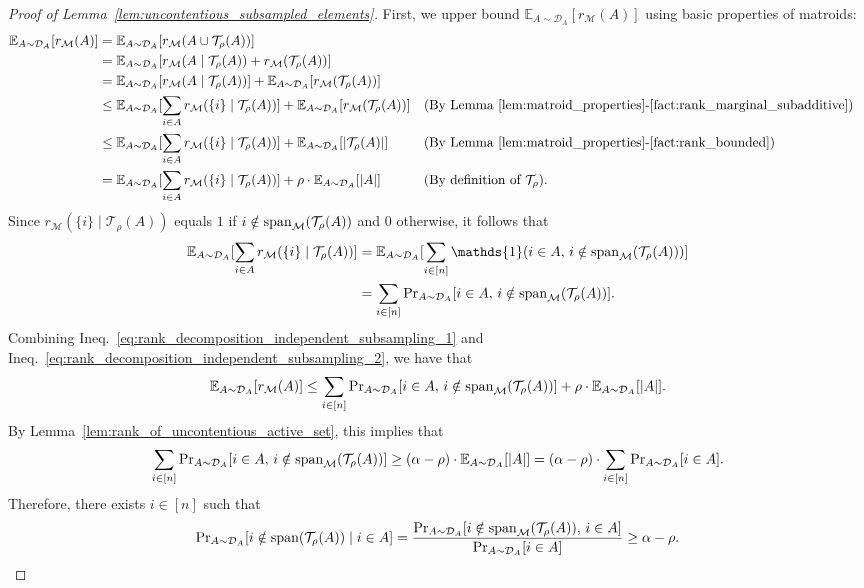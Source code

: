 \documentclass[11pt]{article}
\newcommand{\D}{\mathcal D}
\def \E {\mathbb{E}}
\newcommand{\M}{{\mathcal M}}
\newcommand{\T}{{\mathcal T}}
\newcommand{\spa}{\textnormal{span}}
\begin{document}
\begin{proof}[Proof of Lemma~\ref{lem:uncontentious_subsampled_elements}]
First, we upper bound $\E_{A\sim\D_A}[r_{\M}(A)]$ using basic properties of matroids:
\begin{align}\label{eq:rank_decomposition_independent_subsampling_1}
    \E_{A\sim\D_A}[r_{\M}(A)]&=\E_{A\sim\D_A}[r_{\M}(A\cup\T_{\rho}(A))]\nonumber\\
    &=\E_{A\sim\D_A}[r_{\M}(A\mid\T_{\rho}(A))+r_{\M}(\T_{\rho}(A))]\nonumber\\
    &=\E_{A\sim\D_A}[r_{\M}(A\mid\T_{\rho}(A))]+\E_{A\sim\D_A}[r_{\M}(\T_{\rho}(A))] \nonumber\\
    &\le\E_{A\sim\D_A}[\sum_{i\in A}r_{\M}(\{i\}\mid\T_{\rho}(A))]+\E_{A\sim\D_A}[r_{\M}(\T_{\rho}(A))] &&\text{(By Lemma~\ref{lem:matroid_properties}-\ref{fact:rank_marginal_subadditive})}\nonumber\\
    &\le\E_{A\sim\D_A}[\sum_{i\in A}r_{\M}(\{i\}\mid\T_{\rho}(A))]+\E_{A\sim\D_A}[|\T_{\rho}(A)|] &&\text{(By Lemma~\ref{lem:matroid_properties}-\ref{fact:rank_bounded})}\nonumber\\
    &=\E_{A\sim\D_A}[\sum_{i\in A}r_{\M}(\{i\}\mid\T_{\rho}(A))]+\rho\cdot\E_{A\sim\D_A}[|A|] &&\text{(By definition of $\T_{\rho}$)}.
\end{align}
Since $r_{\M}(\{i\}\mid\T_{\rho}(A))$ equals $1$ if $i\notin\spa_{\M}(\T_{\rho}(A))$ and $0$ otherwise, it follows that
\begin{align}\label{eq:rank_decomposition_independent_subsampling_2}
    \E_{A\sim\D_A}[\sum_{i\in A}r_{\M}(\{i\}\mid\T_{\rho}(A))]&=\E_{A\sim\D_A}[\sum_{i\in [n]} \mathds{1}(i\in A,\,i\notin\spa_{\M}(\T_{\rho}(A)))]\nonumber\\
    &=\sum_{i\in[n]}\Pr\nolimits_{A\sim\D_A}[i\in A,\,i\notin\spa_{\M}(\T_{\rho}(A))].
\end{align}
Combining Ineq.~\eqref{eq:rank_decomposition_independent_subsampling_1} and Ineq.~\eqref{eq:rank_decomposition_independent_subsampling_2}, we have that
\[
    \E_{A\sim\D_A}[r_{\M}(A)]\le\sum_{i\in[n]}\Pr\nolimits_{A\sim\D_A}[i\in A,\,i\notin\spa_{\M}(\T_{\rho}(A))]+\rho\cdot\E_{A\sim\D_A}[|A|].
\]
By Lemma~\ref{lem:rank_of_uncontentious_active_set}, this implies that
\[
    \sum_{i\in[n]}\Pr\nolimits_{A\sim\D_A}[i\in A,\,i\notin\spa_{\M}(\T_{\rho}(A))]\ge(\alpha-\rho)\cdot\E_{A\sim\D_A}[|A|]=(\alpha-\rho)\cdot\sum_{i\in[n]}\Pr\nolimits_{A\sim\D_A}[i\in A].
\]
Therefore, there exists $i\in [n]$ such that
\[
    \Pr\nolimits_{A\sim\D_A}[i\notin\spa(\T_{\rho}(A))\mid i\in A]=\frac{\Pr\nolimits_{A\sim\D_A}[i\notin\spa_{\M}(\T_{\rho}(A)),\,i\in A]}{\Pr\nolimits_{A\sim\D_A}[i\in A]}\ge \alpha-\rho.
\]
\end{proof}
\end{document}
